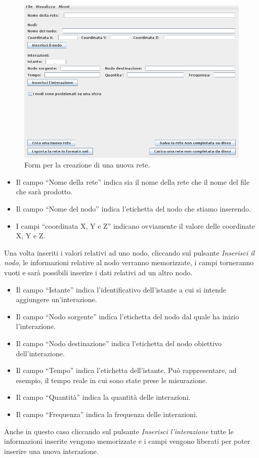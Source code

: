 \documentclass[a4paper,12pt]{article}
\begin{document}
\begin{figure}[htb!]
 \begin{center}
  \includegraphics[width=\textwidth]{images/create-network.png}
 \end{center}
 \caption{Form per la creazione di una nuova rete.}
 \label{fig:createnetwork}
\end{figure}

\begin{itemize}
 \item Il campo ``Nome della rete'' indica sia il nome della rete che il nome del file che sar\`a prodotto.
 \item Il campo ``Nome del nodo'' indica l'etichetta del nodo che stiamo inserendo.
 \item I campi ``coordinata X, Y e Z'' indicano ovviamente il valore delle coordinate X, Y e Z.
\end{itemize}
Una volta inseriti i valori relativi ad uno nodo, cliccando sul pulsante \textit{Inserisci il nodo}, le informazioni relative al nodo verranno memorizzate, i campi torneranno vuoti e sar\`a possibili inserire i dati relativi ad un altro nodo.

\begin{itemize}
 \item Il campo ``Istante'' indica l'identificativo dell'istante a cui si intende aggiungere un'interazione.
 \item Il campo ``Nodo sorgente'' indica l'etichetta del nodo dal quale ha inizio l'interazione.
 \item Il campo ``Nodo destinazione'' indica l'etichetta del nodo obiettivo dell'interazione.
 \item Il campo ``Tempo'' indica l'etichetta dell'istante. Pu\`o rappresentare, ad esempio, il tempo reale in cui sono state prese le misurazione.
 \item Il campo ``Quantit\`a'' indica la quantit\`a delle interazioni.
 \item Il campo ``Frequenza'' indica la frequenza delle interazioni.
\end{itemize}
Anche in questo caso cliccando sul pulsante \textit{Inserisci l'interazione} tutte le informazioni inserite vengono memorizzate e i campi vengono liberati per poter inserire una nuova interazione.
\end{document}
